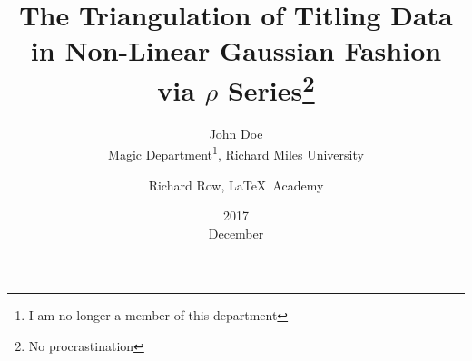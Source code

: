 
\title{The Triangulation of Titling Data in Non-Linear Gaussian Fashion via $\rho$ Series\thanks{No procrastination}}
\date{2017\\ December}
\author{John Doe\\ Magic Department\thanks{I am no longer a member of this department}, Richard Miles University
\and Richard Row, \LaTeX\ Academy}

%
%
%
%
%
%
%
%
%
%
%
%
%
%
%
%
%
%
%
%
%
%
%
%
